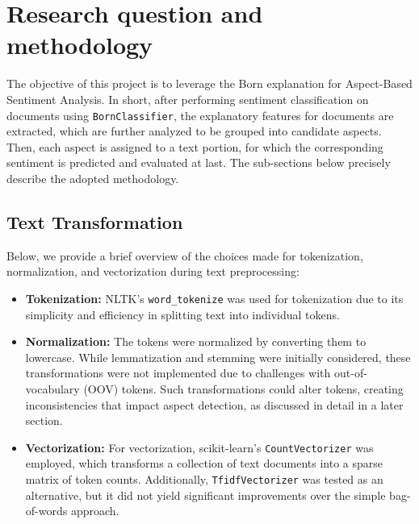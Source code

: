 
\section{Research question and methodology}\label{sec2}


The objective of this project is to leverage the Born explanation for Aspect-Based Sentiment Analysis. In short, after performing sentiment classification on documents using \texttt{BornClassifier}, the explanatory features for documents are extracted, which are further analyzed to be grouped into candidate aspects. Then, each aspect is assigned to a text portion, for which the corresponding sentiment is predicted and evaluated at last. The sub-sections below precisely describe the adopted methodology.

\subsection{Text Transformation}\label{sec:transformation}

Below, we provide a brief overview of the choices made for tokenization, normalization, and vectorization during text preprocessing:

\begin{itemize}
    \item \textbf{Tokenization:} NLTK's \texttt{word\_tokenize} was used for tokenization due to its simplicity and efficiency in splitting text into individual tokens.
    
    \item \textbf{Normalization:} The tokens were normalized by converting them to lowercase. While lemmatization and stemming were initially considered, these transformations were not implemented due to challenges with out-of-vocabulary (OOV) tokens. Such transformations could alter tokens, creating inconsistencies that impact aspect detection, as discussed in detail in a later section.
    
    \item \textbf{Vectorization:} For vectorization, scikit-learn's \texttt{CountVectorizer} was employed, which transforms a collection of text documents into a sparse matrix of token counts. Additionally, \texttt{TfidfVectorizer} was tested as an alternative, but it did not yield significant improvements over the simple bag-of-words approach.
\end{itemize}


